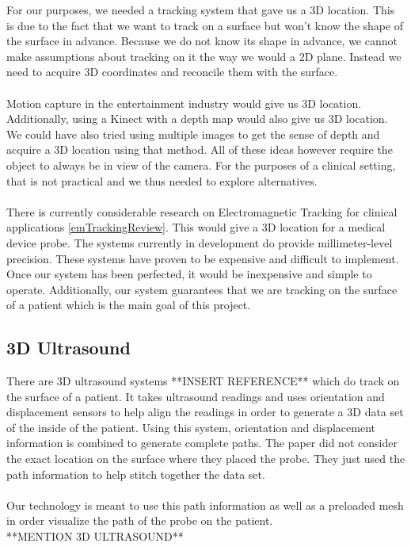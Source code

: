 For our purposes, we needed a tracking system that gave us a 3D location. This is due to the fact that we want to track on a surface but won't know the shape of the surface in advance. Because we do not know its shape in advance, we cannot make assumptions about tracking on it the way we would a 2D plane. Instead we need to acquire 3D coordinates and reconcile them with the surface. \\
\\
Motion capture in the entertainment industry would give us 3D location. Additionally, using a Kinect with a depth map would also give us 3D location. We could have also tried using multiple images to get the sense of depth and acquire a 3D location using that method. All of these ideas however require the object to always be in view of the camera. For the purposes of a clinical setting, that is not practical and we thus needed to explore alternatives. \\
\\
There is currently considerable research on Electromagnetic Tracking for clinical applications \ref{emTrackingReview}. This would give a 3D location for a medical device probe. The systems currently in development do provide millimeter-level precision. These systems have proven to be expensive and difficult to implement. Once our system has been perfected, it would be inexpensive and simple to operate. Additionally, our system guarantees that we are tracking on the surface of a patient which is the main goal of this project. 

\subsection{3D Ultrasound}

There are 3D ultrasound systems **INSERT REFERENCE** which do track on the surface of a patient. It takes ultrasound readings and uses orientation and displacement sensors to help align the readings in order to generate a 3D data set of the inside of the patient. Using this system, orientation and displacement information is combined to generate complete paths. The paper did not consider the exact location on the surface where they placed the probe. They just used the path information to help stitch together the data set. \\
\\
Our technology is meant to use this path information as well as a preloaded mesh in order visualize the path of the probe on the patient. \\
**MENTION 3D ULTRASOUND**\\

